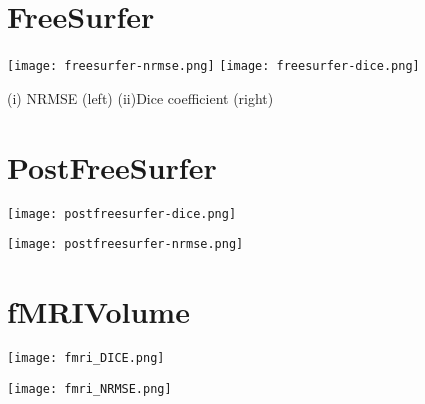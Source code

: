 

\section{FreeSurfer} \label{sec:Freesurfer}
\begin{center}
\texttt{[image: freesurfer-nrmse.png]}%
\texttt{[image: freesurfer-dice.png]}
\caption*{(i) NRMSE (left) (ii)Dice coefficient (right)}
\label{fig:freesurfer_metric_values}
\end{center}



\section{PostFreeSurfer}\label{sec:Postfreesurfer}
\begin{center}
  \texttt{[image: postfreesurfer-dice.png]}
   \label{fig:Postfreesurfer_Dice}
\end{center}

\begin{center}
  \texttt{[image: postfreesurfer-nrmse.png]}
   \label{fig:Postfreesurfer_NRMSE}
\end{center}

\section{fMRIVolume}\label{sec:fMRI}
\begin{center}
  \texttt{[image: fmri\_DICE.png]}
   \label{fig:fMRI_Dice}
\end{center}

\begin{center}
  \texttt{[image: fmri\_NRMSE.png]}
   \label{fig:fMRI_NRMSE}
\end{center}

